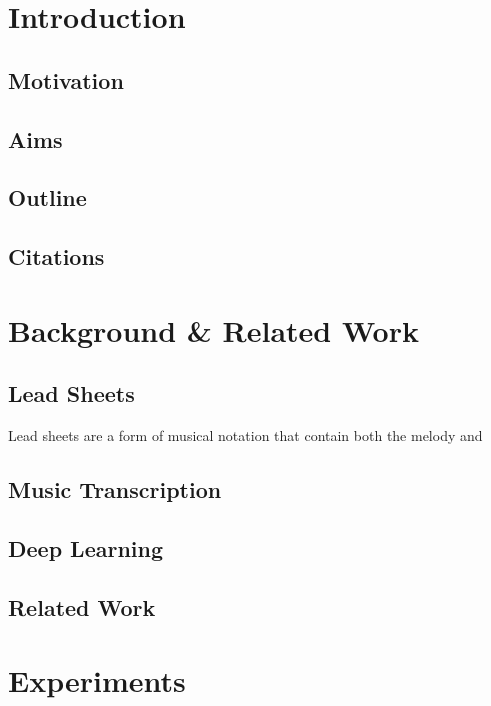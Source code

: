 \documentclass[logo,bsc,singlespacing,parskip,online]{infthesis}
\begin{document}
\chapter{Introduction}

\section{Motivation}

\section{Aims}

\section{Outline}


\section{Citations}
\cite{donahue2022melodytranscriptiongenerativepretraining}


\chapter{Background \& Related Work}

\section{Lead Sheets}

Lead sheets are a form of musical notation that contain both the melody and 

\section{Music Transcription}

\section{Deep Learning}

\section{Related Work}

\chapter{Experiments}
\end{document}
